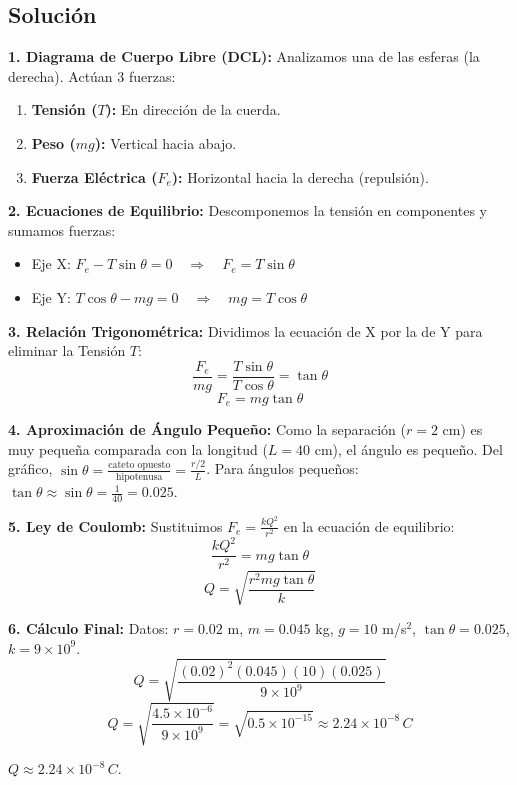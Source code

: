 \documentclass[12pt, a4paper]{article}
\begin{document}
\subsection*{Solución}

\textbf{1. Diagrama de Cuerpo Libre (DCL):}
Analizamos una de las esferas (la derecha). Actúan 3 fuerzas:
\begin{enumerate}
    \item \textbf{Tensión ($T$):} En dirección de la cuerda.
    \item \textbf{Peso ($mg$):} Vertical hacia abajo.
    \item \textbf{Fuerza Eléctrica ($F_e$):} Horizontal hacia la derecha (repulsión).
\end{enumerate}

\textbf{2. Ecuaciones de Equilibrio:}
Descomponemos la tensión en componentes y sumamos fuerzas:
\begin{itemize}
    \item Eje X: $F_e - T \sin\theta = 0 \quad \Rightarrow \quad F_e = T \sin\theta$
    \item Eje Y: $T \cos\theta - mg = 0 \quad \Rightarrow \quad mg = T \cos\theta$
\end{itemize}

\textbf{3. Relación Trigonométrica:}
Dividimos la ecuación de X por la de Y para eliminar la Tensión $T$:
$$ \frac{F_e}{mg} = \frac{T \sin\theta}{T \cos\theta} = \tan\theta $$
$$ F_e = mg \tan\theta $$

\textbf{4. Aproximación de Ángulo Pequeño:}
Como la separación ($r=2$ cm) es muy pequeña comparada con la longitud ($L=40$ cm), el ángulo es pequeño.
Del gráfico, $\sin\theta = \frac{\text{cateto opuesto}}{\text{hipotenusa}} = \frac{r/2}{L}$.
Para ángulos pequeños: $\tan\theta \approx \sin\theta = \frac{1}{40} = 0.025$.

\textbf{5. Ley de Coulomb:}
Sustituimos $F_e = \frac{k Q^2}{r^2}$ en la ecuación de equilibrio:
$$ \frac{k Q^2}{r^2} = mg \tan\theta $$
$$ Q = \sqrt{\frac{r^2 m g \tan\theta}{k}} $$

\textbf{6. Cálculo Final:}
Datos: $r=0.02$ m, $m=0.045$ kg, $g=10$ m/s$^2$, $\tan\theta=0.025$, $k=9\times 10^9$.
$$ Q = \sqrt{\frac{(0.02)^2 (0.045)(10)(0.025)}{9 \times 10^9}} $$
$$ Q = \sqrt{\frac{4.5 \times 10^{-6}}{9 \times 10^9}} = \sqrt{0.5 \times 10^{-15}} \approx 2.24 \times 10^{-8} \, \si{C} $$

\begin{tcolorbox}[colback=green!5!white,title=Respuesta]
$Q \approx 2.24 \times 10^{-8} \, \si{C}$.
\end{tcolorbox}
\end{document}
